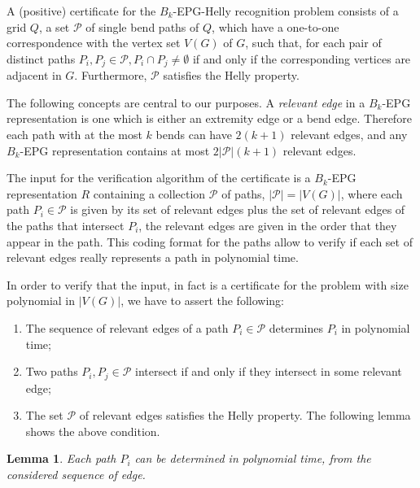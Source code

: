 \documentclass[9pt]{entcs}
\newtheorem{lema}{Lemma}[section]
\begin{document}


A (positive) certificate for the {\sc $B_k$-EPG-Helly recognition} problem consists of a grid $Q$, a set $\mathcal{P}$ of single bend paths of $Q$, which have a one-to-one correspondence with the vertex set $V(G)$ of $G$, such that, for each pair of distinct paths $P_i, P_j\in \mathcal{P}, P_i\cap P_j \neq \emptyset $ if and only if the corresponding vertices are adjacent in $G$. Furthermore, $\mathcal{P}$ satisfies the Helly property.


The following concepts are central to our purposes. A \emph{relevant edge} in a  $B_k$-EPG representation is one which is either an extremity edge or a bend edge. Therefore each path with at the most $k$ bends can have $2(k+1)$ relevant edges, and any $B_k$-EPG representation contains at most $2|\mathcal{P}|(k+1)$ relevant edges.

The input for the verification algorithm of the certificate is a $B_k$-EPG representation $R$ containing a collection $\mathcal{P}$ of paths, $|\mathcal{P}|=|V(G)|$, where each path $P_i \in \mathcal{P}$ is given by its set of relevant edges plus the set of relevant edges of the paths that intersect $P_i$, the relevant edges are given in the order that they appear in the path. This coding format for the paths allow to verify if each set of relevant edges really represents a path in polynomial time.

In order to verify that the input, in fact is a certificate for the problem with size polynomial in $|V(G)|$, we have to assert the following:

\begin{enumerate}[label=(\roman*)]
\item The sequence of relevant edges of a path $P_i\in \mathcal{P}$ determines $P_i$ in polynomial time; \label{it:bullet1}

\item Two paths $P_i, P_j \in \mathcal{P}$ intersect if and only if they intersect in some relevant edge; \label{it:bullet2}

\item The set $\mathcal{P}$ of relevant edges satisfies the Helly property. The following lemma shows the above condition. \label{it:bullet3}
\end{enumerate}

\begin{lema}\label{lem:verify1}
Each path $P_i$ can be determined in polynomial time, from the considered sequence of edge.
\end{lema}
\end{document}
